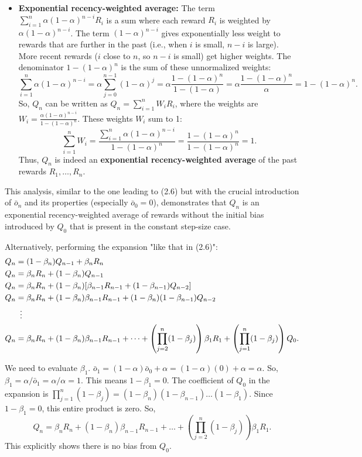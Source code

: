 {\begin{itemize}
    \item \textbf{Exponential recency-weighted average:} The term $\sum_{i=1}^n \alpha (1-\alpha)^{n-i} R_i$ is a sum where each reward $R_i$ is weighted by $\alpha (1-\alpha)^{n-i}$. The term $(1-\alpha)^{n-i}$ gives exponentially less weight to rewards that are further in the past (i.e., when $i$ is small, $n-i$ is large). More recent rewards ($i$ close to $n$, so $n-i$ is small) get higher weights.
    The denominator $1-(1-\alpha)^n$ is the sum of these unnormalized weights:
    \[ \sum_{i=1}^n \alpha (1-\alpha)^{n-i} = \alpha \sum_{j=0}^{n-1} (1-\alpha)^j = \alpha \frac{1-(1-\alpha)^n}{1-(1-\alpha)} = \alpha \frac{1-(1-\alpha)^n}{\alpha} = 1-(1-\alpha)^n. \]
    So, $Q_n$ can be written as $Q_n = \sum_{i=1}^n W_i R_i$, where the weights are $W_i = \frac{\alpha (1-\alpha)^{n-i}}{1-(1-\alpha)^n}$.
    These weights $W_i$ sum to 1:
    \[ \sum_{i=1}^n W_i = \frac{\sum_{i=1}^n \alpha (1-\alpha)^{n-i}}{1-(1-\alpha)^n} = \frac{1-(1-\alpha)^n}{1-(1-\alpha)^n} = 1. \]
    Thus, $Q_n$ is indeed an \textbf{exponential recency-weighted average} of the past rewards $R_1, \dots, R_n$.
\end{itemize}
This analysis, similar to the one leading to (2.6) but with the crucial introduction of $\bar{o}_n$ and its properties (especially $\bar{o}_0=0$), demonstrates that $Q_n$ is an exponential recency-weighted average of rewards without the initial bias introduced by $Q_0$ that is present in the constant step-size case.

\hrulefill

Alternatively, performing the expansion "like that in (2.6)":
\begin{align*}
Q_n &= (1-\beta_n)Q_{n-1} + \beta_n R_n \\
Q_n &= \beta_n R_n + (1-\beta_n)Q_{n-1} \\
Q_n &= \beta_n R_n + (1-\beta_n)[\beta_{n-1}R_{n-1} + (1-\beta_{n-1})Q_{n-2}] \\
Q_n &= \beta_n R_n + (1-\beta_n)\beta_{n-1}R_{n-1} + (1-\beta_n)(1-\beta_{n-1})Q_{n-2} \\
&\vdotswithin{=} \\
Q_n &= \beta_n R_n + (1-\beta_n)\beta_{n-1}R_{n-1} + \dots + \left( \prod_{j=2}^{n} (1-\beta_j) \right) \beta_1 R_1 + \left( \prod_{j=1}^{n} (1-\beta_j) \right) Q_0.
\end{align*}

We need to evaluate $\beta_1$.
$\bar{o}_1 = (1-\alpha)\bar{o}_0 + \alpha = (1-\alpha)(0) + \alpha = \alpha$.
So, $\beta_1 = \alpha / \bar{o}_1 = \alpha / \alpha = 1$.
This means $1-\beta_1 = 0$.
The coefficient of $Q_0$ in the expansion is $\prod_{j=1}^{n} (1-\beta_j) = (1-\beta_n)(1-\beta_{n-1})\dots(1-\beta_1)$. Since $1-\beta_1=0$, this entire product is zero.
So,
\begin{equation}
Q_n = \beta_n R_n + (1-\beta_n)\beta_{n-1}R_{n-1} + \dots + \left( \prod_{j=2}^{n} (1-\beta_j) \right) \beta_1 R_1.
\end{equation}
This explicitly shows there is no bias from $Q_0$.

}
